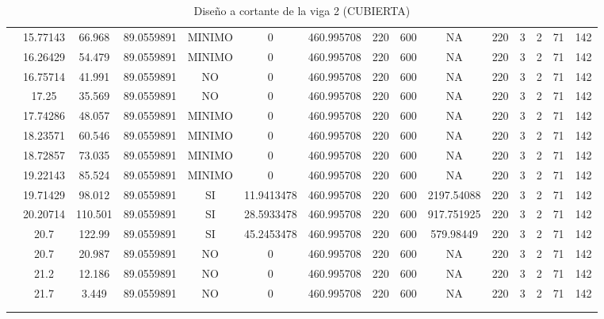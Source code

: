 \begin{table}[H]
{\begin{tabular}{|c|c|c|c|c|c|c|c|c|c|c|c|c|c|c|}
\cline{2-15}    & 15.77143 & 66.968 & 89.0559891 & MINIMO & 0   & 460.995708 & 220 & 600 & NA  & 220 & 3   & 2   & 71  & 142 \bigstrut\\
\cline{2-15}    & 16.26429 & 54.479 & 89.0559891 & MINIMO & 0   & 460.995708 & 220 & 600 & NA  & 220 & 3   & 2   & 71  & 142 \bigstrut\\
\cline{2-15}    & 16.75714 & 41.991 & 89.0559891 & NO  & 0   & 460.995708 & 220 & 600 & NA  & 220 & 3   & 2   & 71  & 142 \bigstrut\\
\cline{2-15}    & 17.25 & 35.569 & 89.0559891 & NO  & 0   & 460.995708 & 220 & 600 & NA  & 220 & 3   & 2   & 71  & 142 \bigstrut\\
\cline{2-15}    & 17.74286 & 48.057 & 89.0559891 & MINIMO & 0   & 460.995708 & 220 & 600 & NA  & 220 & 3   & 2   & 71  & 142 \bigstrut\\
\cline{2-15}    & 18.23571 & 60.546 & 89.0559891 & MINIMO & 0   & 460.995708 & 220 & 600 & NA  & 220 & 3   & 2   & 71  & 142 \bigstrut\\
\cline{2-15}    & 18.72857 & 73.035 & 89.0559891 & MINIMO & 0   & 460.995708 & 220 & 600 & NA  & 220 & 3   & 2   & 71  & 142 \bigstrut\\
\cline{2-15}    & 19.22143 & 85.524 & 89.0559891 & MINIMO & 0   & 460.995708 & 220 & 600 & NA  & 220 & 3   & 2   & 71  & 142 \bigstrut\\
\cline{2-15}    & 19.71429 & 98.012 & 89.0559891 & SI  & 11.9413478 & 460.995708 & 220 & 600 & 2197.54088 & 220 & 3   & 2   & 71  & 142 \bigstrut\\
\cline{2-15}    & 20.20714 & 110.501 & 89.0559891 & SI  & 28.5933478 & 460.995708 & 220 & 600 & 917.751925 & 220 & 3   & 2   & 71  & 142 \bigstrut\\
\cline{2-15}    & 20.7 & 122.99 & 89.0559891 & SI  & 45.2453478 & 460.995708 & 220 & 600 & 579.98449 & 220 & 3   & 2   & 71  & 142 \bigstrut\\
\cline{2-15}    & 20.7 & 20.987 & 89.0559891 & NO  & 0   & 460.995708 & 220 & 600 & NA  & 220 & 3   & 2   & 71  & 142 \bigstrut\\
\cline{2-15}    & 21.2 & 12.186 & 89.0559891 & NO  & 0   & 460.995708 & 220 & 600 & NA  & 220 & 3   & 2   & 71  & 142 \bigstrut\\
\cline{2-15}    & 21.7 & 3.449 & 89.0559891 & NO  & 0   & 460.995708 & 220 & 600 & NA  & 220 & 3   & 2   & 71  & 142 \bigstrut\\
\cline{2-15}    &     &     &     &     &     &     &     &     &     &     &     &     &     &  \bigstrut\\
\cline{2-15}    &     &     &     &     &     &     &     &     &     &     &     &     &     &  \bigstrut\\
\hline
\end{tabular}%



  
 
  }%
    \caption{Diseño a cortante de la viga 2 (CUBIERTA) }
  \label{tab:C VG2 CUB }%
\end{table}%
